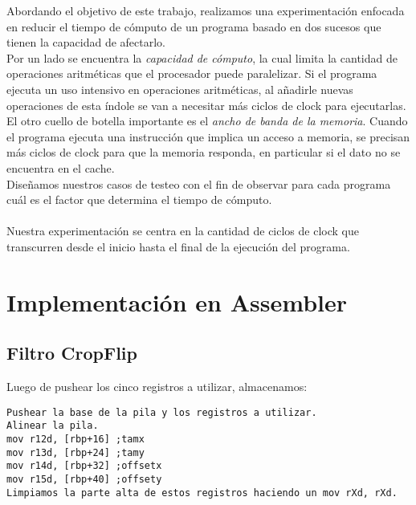 \documentclass[a4paper]{article}
\begin{document}
Abordando el objetivo de este trabajo, realizamos una experimentaci\'on enfocada en reducir el tiempo de c\'omputo de un programa basado en dos sucesos que tienen la capacidad de afectarlo. \\
\indent Por un lado se encuentra la \textit{capacidad de c\'omputo}, la cual limita la cantidad de operaciones aritm\'eticas que el procesador puede paralelizar. Si el programa ejecuta un uso intensivo en operaciones aritm\'eticas, al añadirle nuevas operaciones de esta \'indole se van a necesitar m\'as ciclos de clock para ejecutarlas. \\
\indent El otro cuello de botella importante es el \textit{ancho de banda de la memoria}. Cuando el programa ejecuta una instrucci\'on que implica un acceso a memoria, se precisan m\'as ciclos de clock para que la memoria responda, en particular si el dato no se encuentra en el cache.\\
\indent Diseñamos nuestros casos de testeo con el fin de observar para cada programa cu\'al es el factor que determina el tiempo de c\'omputo.\\
\\
\indent Nuestra experimentaci\'on se centra en la cantidad de ciclos de clock que transcurren desde el inicio hasta el final de la ejecuci\'on del programa. \\

\newpage
\section{Implementaci\'on en Assembler}

\subsection{Filtro CropFlip}
\indent Luego de pushear los cinco registros a utilizar, almacenamos: \\
\begin{codesnippet}
\begin{verbatim}
Pushear la base de la pila y los registros a utilizar.
Alinear la pila.
mov r12d, [rbp+16] ;tamx
mov r13d, [rbp+24] ;tamy
mov r14d, [rbp+32] ;offsetx
mov r15d, [rbp+40] ;offsety
Limpiamos la parte alta de estos registros haciendo un mov rXd, rXd.
\end{verbatim}
\end{codesnippet}
\end{document}
